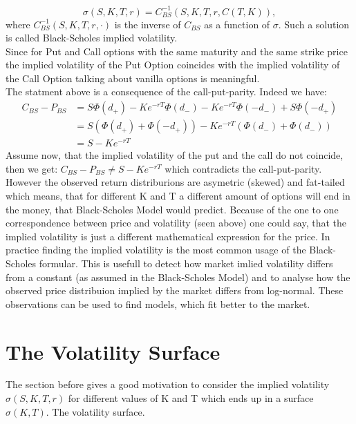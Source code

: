 \documentclass[12pt]{article}
\newcommand{\C}{C_{BS}}
\begin{document}
$$\sigma(S,K,T,r)=\C^{-1}(S,K,T,r,C(T,K)),$$
where $\C^{-1}(S,K,T,r,\cdot)$ is the inverse of $\C$ as a function of $\sigma$.
Such a solution is called Black-Scholes implied volatility.\\
Since for Put and Call options with the same maturity and the same strike price the implied volatility of the Put Option coincides with the implied volatility of the Call Option talking about vanilla options is meaningful.\\
The statment above is a consequence of the call-put-parity. Indeed we have:
\begin{align*}
\C-P_{BS}&=S\Phi(d_+)-Ke^{-rT}\Phi(d_-)-Ke^{-rT}\Phi(-d_-)+S\Phi(-d_+)\\
&=S(\Phi(d_+)+\Phi(-d_+))-Ke^{-rT}(\Phi(d_-)+\Phi(d_-))\\
&=S-Ke^{-rT}
\end{align*}
Assume now, that the implied volatility of the put and the call do not coincide, then we get:
$\C-P_{BS}\neq S-Ke^{-rT}$ which contradicts the call-put-parity.\\
However the observed return distriburions are asymetric (skewed) and fat-tailed which means, that for different K and T a different amount of options will end in the money, that Black-Scholes Model would predict. 
Because of the one to one correspondence between price and volatility (seen above) one could say, that the implied volatility is just a different mathematical expression for the price.
In practice finding the implied volatility is the most common usage of the Black-Scholes formular. This is usefull to detect how market imlied volatility differs from a constant (as assumed in the Black-Scholes Model) and to analyse how the observed price distribuion implied by the market differs from log-normal. These observations can be used to find models, which fit better to the market.

\section{The Volatility Surface}
The section before gives a good motivation to consider the implied volatility $\sigma(S,K,T,r)$ for different values of K and T which ends up in a surface $\sigma(K,T)$. The volatility surface.
\end{document}
